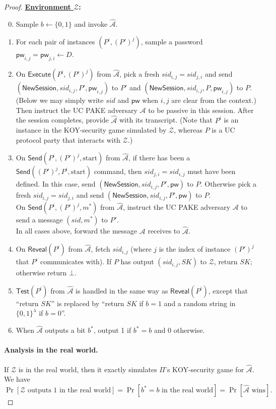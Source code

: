\documentclass{article}
\newcommand{\adv}{\mathcal{A}}
\newcommand{\env}{\mathcal{Z}}
\newcommand{\pw}{\mathsf{pw}}
\newcommand{\NewSession}{\mathsf{NewSession}}
\newcommand{\Execute}{\mathsf{Execute}}
\newcommand{\Send}{\mathsf{Send}}
\newcommand{\Reveal}{\mathsf{Reveal}}
\newcommand{\Test}{\mathsf{Test}}
\begin{document}
\begin{proof}
\bigskip\noindent\textbf{\underline{Environment $\env$}:}
\begin{enumerate}
\setcounter{enumi}{-1}
  \item Sample $b \gets \{0,1\}$ and invoke $\widehat{\adv}$.
  \item For each pair of instances $(P^i, (P')^j)$, sample a password $\pw_{i,j} = \pw_{j,i} \gets D$.
  \item On $\Execute(P^i, (P')^j)$ from $\widehat{\adv}$, pick a fresh $sid_{i,j} = sid_{j,i}$ and send $(\NewSession, sid_{i,j}, P', \pw_{i,j})$ to $P'$ and $(\NewSession, sid_{i,j}, P, \pw_{i,j})$ to $P$. (Below we may simply write $sid$ and $\pw$ when $i,j$ are clear from the context.) Then instruct the UC PAKE adversary $\adv$ to be passive in this session. After the session completes, provide $\widehat{\adv}$ with its transcript. (Note that $P^i$ is an instance in the KOY-security game simulated by $\env$, whereas $P$ is a UC protocol party that interacts with $\env$.)
  \item On $\Send(P^i, (P')^j, \text{start})$ from $\widehat{\adv}$, if there has been a $\Send((P')^j, P^i, \text{start})$ command, then $sid_{j,i} = sid_{i,j}$ must have been defined. In this case, send $(\NewSession, sid_{i,j}, P', \pw)$ to $P$. Otherwise pick a fresh $sid_{i,j} = sid_{j,i}$ and send $(\NewSession, sid_{i,j}, P', \pw)$ to $P$. \\
      On $\Send(P^i, (P')^j, m^*)$ from $\widehat{\adv}$, instruct the UC PAKE adversary $\adv$ to send a message $(sid, m^*)$ to $P'$. \\
      In all cases above, forward the message $\adv$ receives to $\widehat{\adv}$.
  \item On $\Reveal(P^i)$ from $\widehat{\adv}$, fetch $sid_{i,j}$ (where $j$ is the index of instance $(P')^j$ that $P^i$ communicates with). If $P$ has output $(sid_{i,j}, SK)$ to $\env$, return $SK$; otherwise return $\bot$.
  \item $\Test(P^i)$ from $\widehat{\adv}$ is handled in the same way as $\Reveal(P^i)$, except that ``return $SK$'' is replaced by ``return $SK$ if $b = 1$ and a random string in $\{0,1\}^\lambda$ if $b = 0$''.
  \item When $\widehat{\adv}$ outputs a bit $b^*$, output 1 if $b^* = b$ and 0 otherwise.
\end{enumerate}
\paragraph{Analysis in the real world.}
If $\env$ is in the real world, then it exactly simulates $\Pi$'s KOY-security game for $\widehat{\adv}$. We have 
\[
\Pr[\env\text{ outputs }1\text{ in the real world}] = \Pr[b^* = b\text{ in the real world}] = \Pr[\widehat{\adv}\text{ wins}].
\]

\end{proof}
\end{document}
